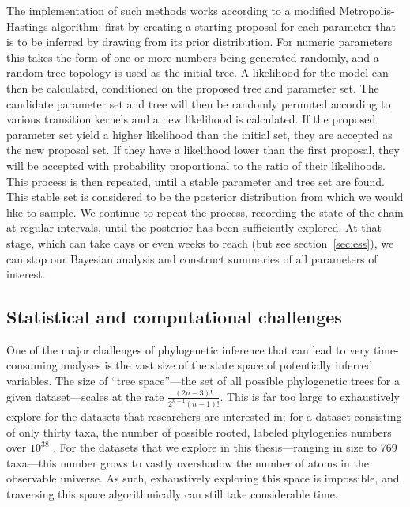 The implementation of such methods works according to a modified Metropolis-Hastings algorithm: first by creating a starting proposal for each parameter that is to be inferred by drawing from its prior distribution.
For numeric parameters this takes the form of one or more numbers being generated randomly, and a random tree topology is used as the initial tree.
A likelihood for the model can then be calculated, conditioned on the proposed tree and parameter set.
The candidate parameter set and tree will then be randomly permuted according to various transition kernels and a new likelihood is calculated. %
If the proposed parameter set yield a higher likelihood than the initial set, they are accepted as the new proposal set.
If they have a likelihood lower than the first proposal, they will be accepted with probability proportional to the ratio of their likelihoods.
This process is then repeated, until a stable parameter and tree set are found.
This stable set is considered to be the posterior distribution from which we would like to sample.
We continue to repeat the process, recording the state of the chain at regular intervals, until the posterior has been sufficiently explored.
At that stage, which can take days or even weeks to reach (but see section~\ref{sec:ess}), we can stop our Bayesian analysis and construct summaries of all parameters of interest.



\subsection{Statistical and computational challenges} %

One of the major challenges of phylogenetic inference that can lead to very time-consuming analyses is the vast size of the state space of potentially inferred variables.
The size of ``tree space''---the set of all possible phylogenetic trees for a given dataset---scales at the rate $\frac{(2n-3)!}{2^{n-1}(n-1)!}$. %
This is far too large to exhaustively explore for the datasets that researchers are interested in; for a dataset consisting of only thirty taxa, the number of possible rooted, labeled phylogenies numbers over $10^{38}$ \cite{felsenstein2003inferring}.
For the datasets that we explore in this thesis---ranging in size to 769 taxa---this number grows to vastly overshadow the number of atoms in the observable universe.
As such, exhaustively exploring this space is impossible, and traversing this space algorithmically can still take considerable time.


